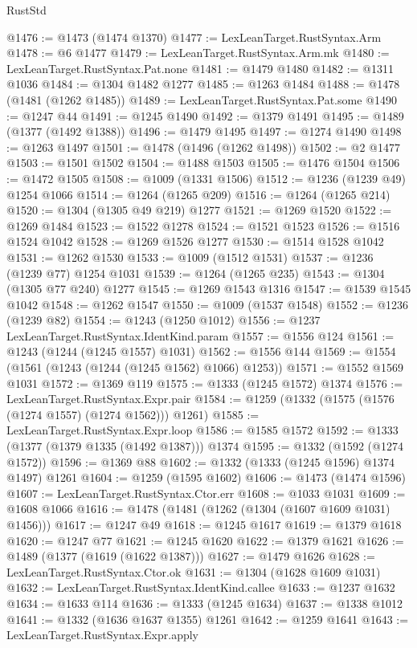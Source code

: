 \begin{lexlean}{RustStd}
\begin{coremodule}
@1476 := @1473 (@1474 @1370)
@1477 := LexLeanTarget.RustSyntax.Arm
@1478 := @6 @1477
@1479 := LexLeanTarget.RustSyntax.Arm.mk
@1480 := LexLeanTarget.RustSyntax.Pat.none
@1481 := @1479 @1480
@1482 := @1311 @1036
@1484 := @1304 @1482 @1277
@1485 := @1263 @1484
@1488 := @1478 (@1481 (@1262 @1485))
@1489 := LexLeanTarget.RustSyntax.Pat.some
@1490 := @1247 @44
@1491 := @1245 @1490
@1492 := @1379 @1491
@1495 := @1489 (@1377 (@1492 @1388))
@1496 := @1479 @1495
@1497 := @1274 @1490
@1498 := @1263 @1497
@1501 := @1478 (@1496 (@1262 @1498))
@1502 := @2 @1477
@1503 := @1501 @1502
@1504 := @1488 @1503
@1505 := @1476 @1504
@1506 := @1472 @1505
@1508 := @1009 (@1331 @1506)
@1512 := @1236 (@1239 @49) @1254 @1066
@1514 := @1264 (@1265 @209)
@1516 := @1264 (@1265 @214)
@1520 := @1304 (@1305 @49 @219) @1277
@1521 := @1269 @1520
@1522 := @1269 @1484
@1523 := @1522 @1278
@1524 := @1521 @1523
@1526 := @1516 @1524 @1042
@1528 := @1269 @1526 @1277
@1530 := @1514 @1528 @1042
@1531 := @1262 @1530
@1533 := @1009 (@1512 @1531)
@1537 := @1236 (@1239 @77) @1254 @1031
@1539 := @1264 (@1265 @235)
@1543 := @1304 (@1305 @77 @240) @1277
@1545 := @1269 @1543 @1316
@1547 := @1539 @1545 @1042
@1548 := @1262 @1547
@1550 := @1009 (@1537 @1548)
@1552 := @1236 (@1239 @82)
@1554 := @1243 (@1250 @1012)
@1556 := @1237 LexLeanTarget.RustSyntax.IdentKind.param
@1557 := @1556 @124
@1561 := @1243 (@1244 (@1245 @1557) @1031)
@1562 := @1556 @144
@1569 := @1554 (@1561 (@1243 (@1244 (@1245 @1562) @1066) @1253))
@1571 := @1552 @1569 @1031
@1572 := @1369 @119
@1575 := @1333 (@1245 @1572) @1374
@1576 := LexLeanTarget.RustSyntax.Expr.pair
@1584 := @1259 (@1332 (@1575 (@1576 (@1274 @1557) (@1274 @1562))) @1261)
@1585 := LexLeanTarget.RustSyntax.Expr.loop
@1586 := @1585 @1572
@1592 := @1333 (@1377 (@1379 @1335 (@1492 @1387))) @1374
@1595 := @1332 (@1592 (@1274 @1572))
@1596 := @1369 @88
@1602 := @1332 (@1333 (@1245 @1596) @1374 @1497) @1261
@1604 := @1259 (@1595 @1602)
@1606 := @1473 (@1474 @1596)
@1607 := LexLeanTarget.RustSyntax.Ctor.err
@1608 := @1033 @1031
@1609 := @1608 @1066
@1616 := @1478 (@1481 (@1262 (@1304 (@1607 @1609 @1031) @1456)))
@1617 := @1247 @49
@1618 := @1245 @1617
@1619 := @1379 @1618
@1620 := @1247 @77
@1621 := @1245 @1620
@1622 := @1379 @1621
@1626 := @1489 (@1377 (@1619 (@1622 @1387)))
@1627 := @1479 @1626
@1628 := LexLeanTarget.RustSyntax.Ctor.ok
@1631 := @1304 (@1628 @1609 @1031)
@1632 := LexLeanTarget.RustSyntax.IdentKind.callee
@1633 := @1237 @1632
@1634 := @1633 @114
@1636 := @1333 (@1245 @1634)
@1637 := @1338 @1012
@1641 := @1332 (@1636 @1637 @1355) @1261
@1642 := @1259 @1641
@1643 := LexLeanTarget.RustSyntax.Expr.apply

\end{coremodule}
\end{lexlean}
